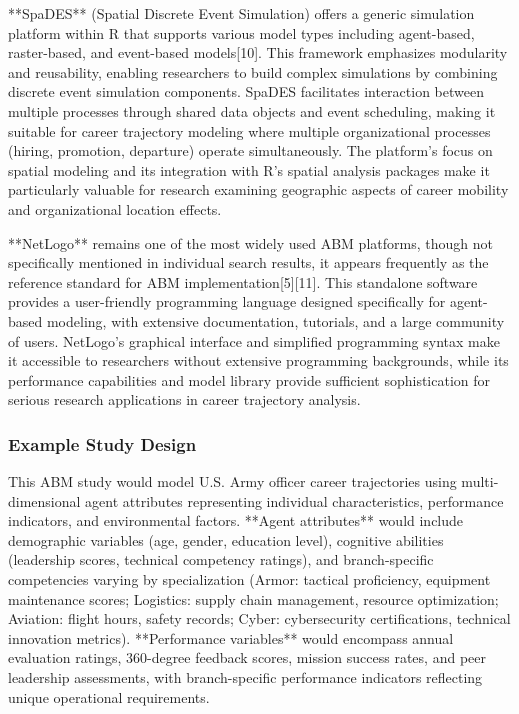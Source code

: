 \documentclass[main.tex]{subfiles}
\begin{document}
**SpaDES** (Spatial Discrete Event Simulation) offers a generic simulation platform within R that supports various model types including agent-based, raster-based, and event-based models[10]. This framework emphasizes modularity and reusability, enabling researchers to build complex simulations by combining discrete event simulation components. SpaDES facilitates interaction between multiple processes through shared data objects and event scheduling, making it suitable for career trajectory modeling where multiple organizational processes (hiring, promotion, departure) operate simultaneously. The platform's focus on spatial modeling and its integration with R's spatial analysis packages make it particularly valuable for research examining geographic aspects of career mobility and organizational location effects.

**NetLogo** remains one of the most widely used ABM platforms, though not specifically mentioned in individual search results, it appears frequently as the reference standard for ABM implementation[5][11]. This standalone software provides a user-friendly programming language designed specifically for agent-based modeling, with extensive documentation, tutorials, and a large community of users. NetLogo's graphical interface and simplified programming syntax make it accessible to researchers without extensive programming backgrounds, while its performance capabilities and model library provide sufficient sophistication for serious research applications in career trajectory analysis.

\subsubsection{Example Study Design}


This ABM study would model U.S. Army officer career trajectories using multi-dimensional agent attributes representing individual characteristics, performance indicators, and environmental factors. **Agent attributes** would include demographic variables (age, gender, education level), cognitive abilities (leadership scores, technical competency ratings), and branch-specific competencies varying by specialization (Armor: tactical proficiency, equipment maintenance scores; Logistics: supply chain management, resource optimization; Aviation: flight hours, safety records; Cyber: cybersecurity certifications, technical innovation metrics). **Performance variables** would encompass annual evaluation ratings, 360-degree feedback scores, mission success rates, and peer leadership assessments, with branch-specific performance indicators reflecting unique operational requirements.
\end{document}
